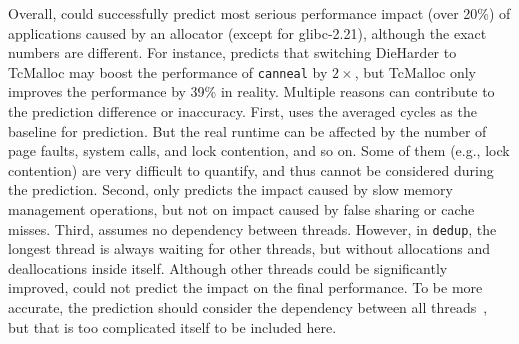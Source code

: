 Overall, \MP{} could successfully predict most serious performance impact (over 20\%) of  applications caused by an allocator (except  for glibc-2.21), although the exact numbers are different. For instance, \MP{} predicts that switching DieHarder to TcMalloc may boost the performance of \texttt{canneal} by $2\times$, but TcMalloc only improves the performance by 39\% in reality. Multiple reasons can contribute to the prediction difference or inaccuracy. First, \MP{} uses the averaged cycles as the baseline for prediction. But the real runtime can be affected by the number of page faults, system calls, and lock contention, and so on. Some of them (e.g., lock contention) are very difficult to quantify, and thus cannot be considered during the prediction. Second, \MP{} only predicts the impact caused by slow memory management operations, but not on impact caused by false sharing or cache misses. 
Third, \MP{} assumes no dependency between threads. However, in \texttt{dedup}, the longest thread is always waiting for other threads, but without allocations and deallocations inside itself. Although other threads could be significantly improved, \MP{} could not predict the impact on the final performance. To be more accurate, the prediction should consider the dependency between all threads~\cite{wPerf}, but that is too complicated itself to be included here.


